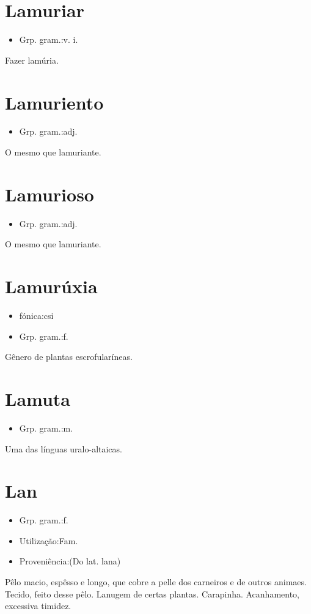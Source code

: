 \section{Lamuriar}
\begin{itemize}
\item {Grp. gram.:v. i.}
\end{itemize}
Fazer lamúria.
\section{Lamuriento}
\begin{itemize}
\item {Grp. gram.:adj.}
\end{itemize}
O mesmo que \textunderscore lamuriante\textunderscore .
\section{Lamurioso}
\begin{itemize}
\item {Grp. gram.:adj.}
\end{itemize}
O mesmo que \textunderscore lamuriante\textunderscore .
\section{Lamurúxia}
\begin{itemize}
\item {fónica:csi}
\end{itemize}
\begin{itemize}
\item {Grp. gram.:f.}
\end{itemize}
Gênero de plantas escrofularíneas.
\section{Lamuta}
\begin{itemize}
\item {Grp. gram.:m.}
\end{itemize}
Uma das línguas uralo-altaicas.
\section{Lan}
\begin{itemize}
\item {Grp. gram.:f.}
\end{itemize}
\begin{itemize}
\item {Utilização:Fam.}
\end{itemize}
\begin{itemize}
\item {Proveniência:(Do lat. \textunderscore lana\textunderscore )}
\end{itemize}
Pêlo macio, espêsso e longo, que cobre a pelle dos carneiros e de outros animaes.
Tecido, feito desse pêlo.
Lanugem de certas plantas.
Carapinha.
Acanhamento, excessiva timidez.
